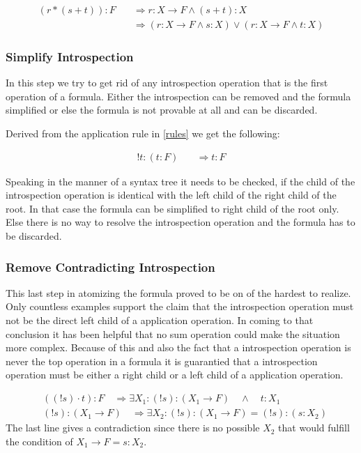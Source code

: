 \begin{align}\label{ss2}
	(r*(s+t)):F  \quad & \Rightarrow r: X \rightarrow F \land (s+t): X \\
	& \Rightarrow ( r: X \rightarrow F \land s: X ) \lor ( r: X \rightarrow F \land t: X )
\end{align}



\subsubsection{Simplify Introspection}
In this step we try to get rid of any introspection operation that is the first operation of a formula. Either the introspection can be removed and the formula simplified or else the formula is not provable at all and can be discarded.

Derived from the application rule in \ref{rules} we get the following:

\begin{align}\label{sb}
	!t:(t:F) \quad & \Rightarrow t: F
\end{align}



Speaking in the manner of a syntax tree it needs to be checked, if the child of the introspection operation is identical with the left child of the right child of the root. In that case the formula can be simplified to right child of the root only. Else there is no way to resolve the introspection operation and the formula has to be discarded.

\subsubsection{Remove Contradicting Introspection}
This last step in atomizing the formula proved to be on of the hardest to realize. Only countless examples support the claim that the introspection operation must not be the direct left child of a application operation. In coming to that conclusion it has been helpful that no sum operation could make the situation more complex. Because of this and also the fact that a introspection operation is never the top operation in a formula it is guarantied that a introspection operation must be either a right child or a left child of a application operation.

\begin{align}\label{bb}
	& ((!s)\cdot t):F  \quad \Rightarrow \exists X_1 : (!s): (X_1 \rightarrow F) \quad \land \quad t: X_1\\
	& (!s): (X_1 \rightarrow F)  \quad \Rightarrow \exists X_2 : (!s):(X_1 \rightarrow F) = (!s):(s:X_2)
\end{align}
The last line gives a contradiction since there is no possible $X_2$ that would fulfill the condition of $X_1 \rightarrow F = s:X_2$.

